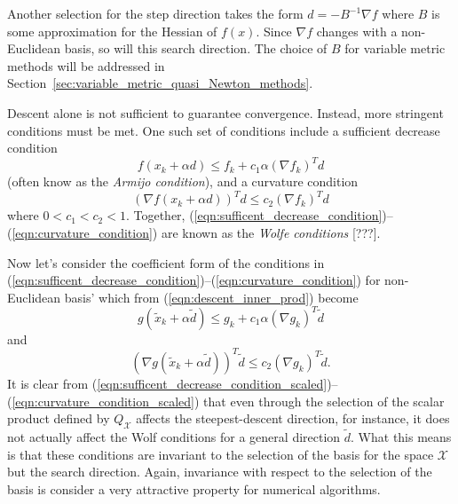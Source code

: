Another selection for the step direction takes the form $d = - B^{-1} {}\nabla
f$ where $B$ is some approximation for the Hessian of $f(x)$.  Since ${}\nabla
f$ changes with a non-Euclidean basis, so will this search direction.  The
choice of $B$ for variable metric methods will be addressed in
Section~\ref{sec:variable_metric_quasi_Newton_methods}.

Descent alone is not sufficient to guarantee convergence.  Instead, more
stringent conditions must be met.  One such set of conditions include a
sufficient decrease condition
%
\begin{equation}
f(x_k + \alpha d) \le f_k + c_1 \alpha (\nabla f_k)^T d
\label{eqn:sufficent_decrease_condition}
\end{equation}
%
(often know as the {}\textit{Armijo condition}), and a curvature condition
%
\begin{equation}
(\nabla f(x_k + \alpha d))^T d \le c_2 (\nabla f_k)^T d
\label{eqn:curvature_condition}
\end{equation}
%
where $0 < c_1 < c_2 < 1$.  Together,
(\ref{eqn:sufficent_decrease_condition})--(\ref{eqn:curvature_condition}) are
known as the {}\textit{Wolfe conditions} [???].

Now let's consider the coefficient form of the conditions in
(\ref{eqn:sufficent_decrease_condition})--(\ref{eqn:curvature_condition}) for
non-Euclidean basis' which from (\ref{eqn:descent_inner_prod}) become
%
\begin{equation}
g(\tilde{x}_k + \alpha \tilde{d}) \le g_k + c_1 \alpha (\nabla g_k)^T \tilde{d}
\label{eqn:sufficent_decrease_condition_scaled}
\end{equation}
%
and
%
\begin{equation}
(\nabla g(\tilde{x}_k + \alpha \tilde{d}))^T \tilde{d} \le c_2 (\nabla g_k)^T \tilde{d}.
\label{eqn:curvature_condition_scaled}
\end{equation}
%
It is clear from
(\ref{eqn:sufficent_decrease_condition_scaled})--(\ref{eqn:curvature_condition_scaled})
that even through the selection of the scalar product defined by
$Q_{\mathcal{X}}$ affects the steepest-descent direction, for instance, it
does not actually affect the Wolf conditions for a general direction
$\tilde{d}$.  What this means is that these conditions are invariant to the
selection of the basis for the space $\mathcal{X}$ but the search direction.
Again, invariance with respect to the selection of the basis is consider a very
attractive property for numerical algorithms.

